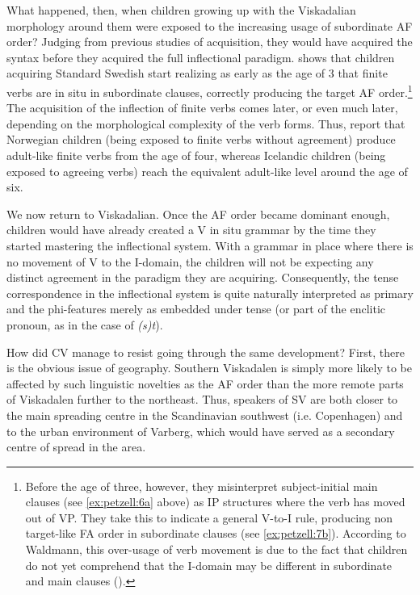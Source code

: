\documentclass[output=paper,colorlinks,citecolor=brown,draft,draftmode]{langscibook}
\begin{document}
What happened, then, when children growing up with the Viskadalian morphology around them were exposed to the increasing usage of subordinate AF order? Judging from previous studies of acquisition, they would have acquired the syntax before they acquired the full inflectional paradigm. \citet{Waldmann2014} shows that children acquiring Standard Swedish start realizing as early as the age of 3 that finite verbs are in situ in subordinate clauses, correctly producing the target AF order.\footnote{Before the age of three, however, they misinterpret subject-initial main clauses (see \ref{ex:petzell:6a} above) as IP structures where the verb has moved out of VP. They take this to indicate a general V-to-I rule, producing non target-like FA order in subordinate clauses (see \ref{ex:petzell:7b}). According to Waldmann, this over-usage of verb movement is due to the fact that children do not yet comprehend that the I-domain may be different in subordinate and main clauses (\citeyear[62–65]{Waldmann2014}).} The acquisition of the inflection of finite verbs comes later, or even much later, depending on the morphological complexity of the verb forms. Thus, \citet{RagnarsdottirEtAl1999} report that Norwegian children (being exposed to finite verbs without agreement) produce adult-like finite verbs from the age of four, whereas Icelandic children (being exposed to agreeing verbs) reach the equivalent adult-like level around the age of six.



We now return to Viskadalian. Once the AF order became dominant enough, children would have already created a V in situ grammar by the time they started mastering the inflectional system. With a grammar in place where there is no movement of V to the I-domain, the children will not be expecting any distinct agreement in the paradigm they are acquiring. Consequently, the tense correspondence in the inflectional system is quite naturally interpreted as primary and the phi-features merely as embedded under tense (or part of the enclitic pronoun, as in the case of \textit{(s)t}).



How did CV manage to resist going through the same development? First, there is the obvious issue of geography. Southern Viskadalen is simply more likely to be affected by such linguistic novelties as the AF order than the more remote parts of Viskadalen further to the northeast. Thus, speakers of SV are both closer to the main spreading centre in the Scandinavian southwest (i.e. Copenhagen) and to the urban environment of Varberg, which would have served as a secondary centre of spread in the area. 
\end{document}
